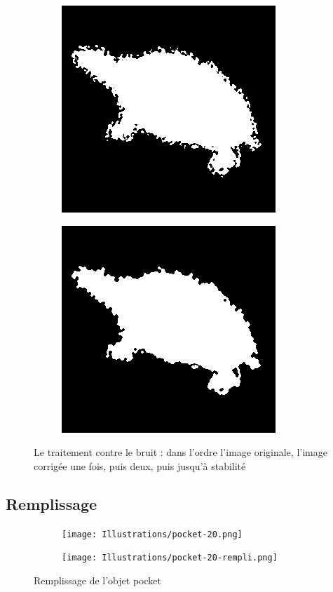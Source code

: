 \documentclass{article}
\theoremstyle{definition}
\begin{document}
\begin{figure}[!h]
\begin{subfigure}{.24\textwidth}
	    \label{spirale-rempli}
	  \end{subfigure}
	  \begin{subfigure}{.24\textwidth}
	    \centering
	    \includegraphics[scale=0.3]{Illustrations/turtle-1-bruit2.png}
	  \label{1stcup-rempli}
	  \end{subfigure}
	  \begin{subfigure}{.24\textwidth}
	    \centering
	    \includegraphics[scale=0.3]{Illustrations/turtle-1-bruitf.png}
	  \label{2ndcup-rempli}
	  \end{subfigure}
	\caption{Le traitement contre le bruit : dans l'ordre l'image originale, l'image corrigée une fois, puis deux, puis jusqu'à stabilité}
	\label{Traitement-Bruit}
    \end{figure}
    
    \subsection{Remplissage}
    \label{sec:remplissage}
    
      \begin{figure}[!h]
	\centering
	\begin{subfigure}{.25\textwidth}
	  \centering
	  \texttt{[image: Illustrations/pocket-20.png]}
	  \label{pocket-non-rempli}
	\end{subfigure}
	\begin{subfigure}{.25\textwidth}
	  \centering
	  \texttt{[image: Illustrations/pocket-20-rempli.png]}
	\label{pocket-rempli}
	\end{subfigure}
	\caption{Remplissage de l'objet pocket}
	\label{remplissage}
      \end{figure}
      
\end{document}
